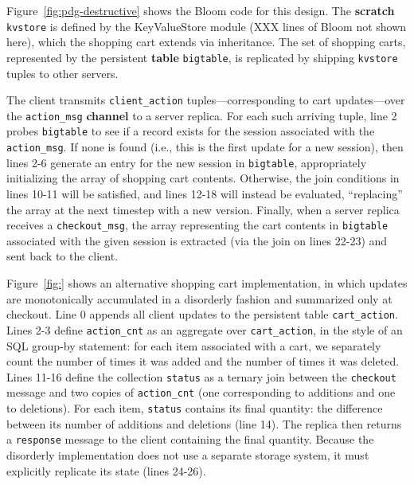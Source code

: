 Figure~\ref{fig:pdg-destructive} shows the Bloom code for this design.  The
\textbf{scratch} \texttt{kvstore} is defined by the KeyValueStore module (XXX
lines of Bloom not shown here), which the shopping cart extends via
inheritance.
The set of shopping carts, represented by the persistent \textbf{table}
\texttt{bigtable}, is 
replicated by shipping \texttt{kvstore} tuples to other servers.


The client transmits \texttt{client\_action} tuples---corresponding to cart
updates---over the \texttt{action\_msg} \textbf{channel} to a server replica.
 For each such arriving
tuple, line 2 probes \texttt{bigtable} to see if a record exists for the
session associated with the \texttt{action\_msg}.  If none is found (i.e., this
is the first update for a new session), then lines 2-6 generate an entry for
the new session in \texttt{bigtable}, appropriately initializing the array of
shopping cart contents.  Otherwise, the join conditions in lines 10-11 will be
satisfied, and lines 12-18 will instead be evaluated, ``replacing'' the array
at the next timestep with a new version.  Finally, when a server replica
receives a \texttt{checkout\_msg}, the array representing the cart contents in
\texttt{bigtable} associated with the given session is extracted (via the join
on lines 22-23) and sent back to the client.

Figure~\ref{fig:} shows an alternative shopping cart implementation, in which
updates are monotonically accumulated in a disorderly fashion and summarized
only at checkout.  Line 0 appends all client updates to the persistent table
\texttt{cart\_action}.  Lines 2-3 define \texttt{action\_cnt} as an aggregate
over \texttt{cart\_action}, in the style of an SQL group-by statement: for each
item associated with a cart, we separately count the number of times it was
added and the number of times it was deleted.  
 Lines 11-16 define the collection
\texttt{status} as a ternary join between the \texttt{checkout} message and two
copies of \texttt{action\_cnt} (one corresponding to additions and one to
deletions).  For each item, \texttt{status} contains its final quantity: the
difference between its number of additions and deletions (line 14).  The
replica then returns a \texttt{response} message to the client containing the
final quantity.  Because the disorderly implementation does not use a separate
storage system, it must explicitly replicate its state (lines 24-26).


